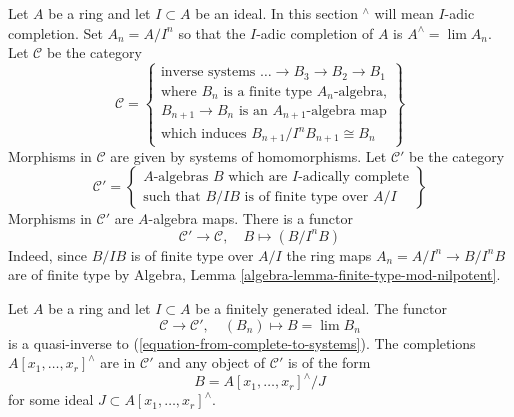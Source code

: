 \noindent
Let $A$ be a ring and let $I \subset A$ be an ideal.
In this section ${}^\wedge$ will mean $I$-adic completion.
Set $A_n = A/I^n$ so that the $I$-adic completion of $A$ is
$A^\wedge = \lim A_n$. Let $\mathcal{C}$ be the
category
\begin{equation}
\label{equation-C}
\mathcal{C} =
\left\{
\begin{matrix}
\text{inverse systems }\ldots \to B_3 \to B_2 \to B_1 \\
\text{where }B_n\text{ is a finite type }A_n\text{-algebra,}\\
B_{n + 1} \to B_n\text{ is an }A_{n + 1}\text{-algebra map}\\
\text{which induces }B_{n + 1}/I^nB_{n + 1} \cong B_n
\end{matrix}
\right\}
\end{equation}
Morphisms in $\mathcal{C}$ are given by systems of homomorphisms.
Let $\mathcal{C}'$ be the category
\begin{equation}
\label{equation-C-prime}
\mathcal{C}' =
\left\{
\begin{matrix}
A\text{-algebras }B\text{ which are }I\text{-adically complete}\\
\text{such that }B/IB\text{ is of finite type over }A/I
\end{matrix}
\right\}
\end{equation}
Morphisms in $\mathcal{C}'$ are $A$-algebra maps. There is a functor
\begin{equation}
\label{equation-from-complete-to-systems}
\mathcal{C}' \longrightarrow \mathcal{C},\quad
B \longmapsto (B/I^nB)
\end{equation}
Indeed, since $B/IB$ is of finite type over $A/I$ the ring maps
$A_n = A/I^n \to B/I^nB$ are of finite type by
Algebra, Lemma \ref{algebra-lemma-finite-type-mod-nilpotent}.

\begin{lemma}
\label{lemma-topologically-finite-type}
Let $A$ be a ring and let $I \subset A$ be a finitely generated ideal.
The functor
$$
\mathcal{C} \longrightarrow \mathcal{C}',\quad
(B_n) \longmapsto B = \lim B_n
$$
is a quasi-inverse to (\ref{equation-from-complete-to-systems}).
The completions $A[x_1, \ldots, x_r]^\wedge$ are in $\mathcal{C}'$ and
any object of $\mathcal{C}'$ is of the form
$$
B = A[x_1, \ldots, x_r]^\wedge / J
$$
for some ideal $J \subset A[x_1, \ldots, x_r]^\wedge$.
\end{lemma}

